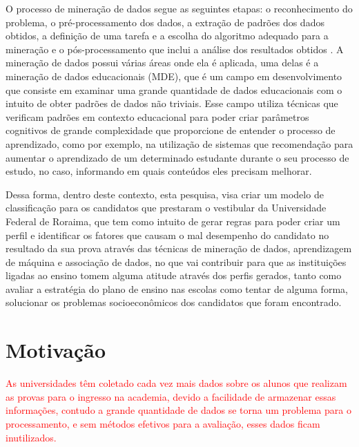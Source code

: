 \par
 O processo de mineração de dados segue as seguintes etapas: o reconhecimento do problema, o pré-processamento dos dados, a extração de padrões dos dados obtidos, a definição de uma tarefa e a escolha do algoritmo adequado para a mineração e o pós-processamento que inclui a análise dos resultados obtidos \cite{Stulp2014}. A mineração de dados possui várias áreas onde ela é aplicada, uma delas é a mineração de dados educacionais (MDE), que é um campo em desenvolvimento que consiste em examinar uma grande quantidade de dados educacionais com o intuito de obter padrões de dados não triviais. Esse campo utiliza técnicas que verificam padrões em contexto educacional para poder criar parâmetros cognitivos de grande complexidade que proporcione de entender o processo de aprendizado, como por exemplo, na utilização de sistemas que recomendação para aumentar o aprendizado de um determinado estudante durante o seu processo de estudo, no caso, informando em quais conteúdos eles precisam melhorar\cite{Cazella2012}.

\par
Dessa forma, dentro deste contexto, esta pesquisa, visa criar um modelo de classificação para os candidatos que prestaram o vestibular da Universidade Federal de Roraima,  que tem como intuito de gerar regras para poder criar um perfil e identificar os fatores que causam o mal desempenho do candidato no resultado da sua prova através das técnicas de mineração de dados, aprendizagem de máquina e associação de dados, no que vai contribuir para que as instituições ligadas ao ensino tomem alguma atitude através dos perfis gerados, tanto como avaliar a estratégia do plano de ensino nas escolas como tentar de alguma forma, solucionar os problemas socioeconômicos dos candidatos que foram encontrado.







\section{Motivação}

\textcolor{red}{As universidades têm coletado cada vez mais dados sobre os alunos que realizam as provas para o ingresso na academia, devido a facilidade de armazenar essas informações, contudo a grande quantidade de dados se torna um problema para o processamento, e sem métodos efetivos para a avaliação, esses dados ficam inutilizados.}

